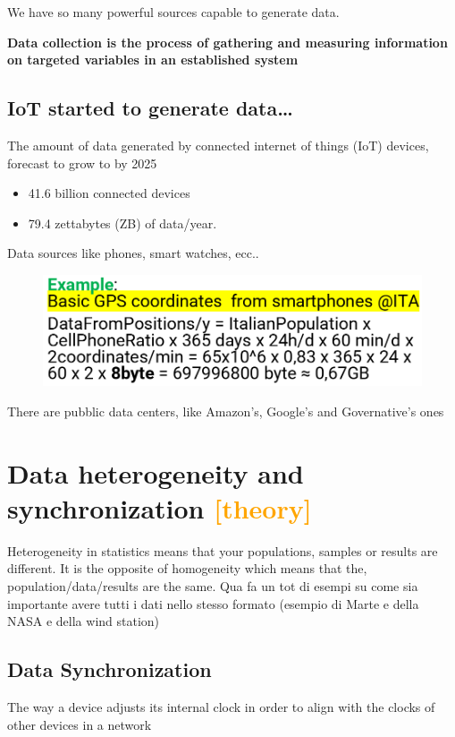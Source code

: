 \noindent We have so many powerful sources capable to generate data.

\noindent \textbf{Data collection is the process of gathering and measuring information on targeted variables in an established system}

\subsection{IoT started to generate data…}
\noindent The amount of data generated by connected internet of things (IoT) devices, forecast to grow to by 2025
\begin{itemize}
    \item 41.6 billion connected devices
    \item 79.4 zettabytes (ZB) of data/year.
\end{itemize} 

\noindent Data sources like phones, smart watches, ecc..

\begin{figure}[H]
    \centering
    \includegraphics[width=0.8\linewidth]{07-08/images/example 1.png}
\end{figure}

\noindent There are pubblic data centers, like Amazon's, Google's and Governative's ones

\section{Data heterogeneity and  \\ synchronization \textcolor{orange}{[theory]}}
\noindent  Heterogeneity in statistics means that your populations, samples or results are different. It is the opposite of homogeneity which means that the, population/data/results are the same.
Qua fa un tot di esempi  su come sia importante avere tutti i dati nello stesso formato (esempio di Marte e della NASA e della wind station)

\subsection{Data Synchronization}
\noindent The way a device adjusts its internal clock in order to align with the clocks of other devices in a network


